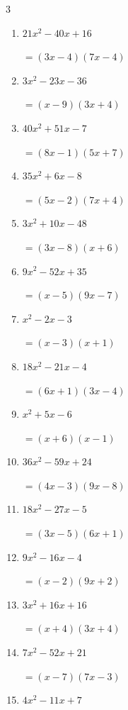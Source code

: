 \begin{multicols}{3}
\begin{enumerate}
\columnbreak %

\resetques

  \item $21x^{2}-40x+16$

        $=(3x-4)(7x-4)$

  \item $3x^{2}-23x-36$

        $=(x-9)(3x+4)$

  \item $40x^{2}+51x-7$

        $=(8x-1)(5x+7)$

  \item $35x^{2}+6x-8$

        $=(5x-2)(7x+4)$

  \item $3x^{2}+10x-48$

        $=(3x-8)(x+6)$

  \item $9x^{2}-52x+35$

        $=(x-5)(9x-7)$

  \item $x^{2}-2x-3$

        $=(x-3)(x+1)$

  \item $18x^{2}-21x-4$

        $=(6x+1)(3x-4)$

  \item $x^{2}+5x-6$

        $=(x+6)(x-1)$

  \item $36x^{2}-59x+24$

        $=(4x-3)(9x-8)$

\columnbreak %

  \item $18x^{2}-27x-5$

        $=(3x-5)(6x+1)$

  \item $9x^{2}-16x-4$

        $=(x-2)(9x+2)$

  \item $3x^{2}+16x+16$

        $=(x+4)(3x+4)$

  \item $7x^{2}-52x+21$

        $=(x-7)(7x-3)$

  \item $4x^{2}-11x+7$


\end{enumerate}
\end{multicols}
